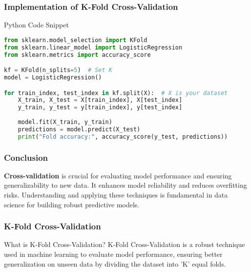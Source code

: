 \documentclass[aspectratio=169]{beamer}
\begin{document}
\begin{frame}[fragile]
    \frametitle{Implementation of K-Fold Cross-Validation}
    \begin{block}{Python Code Snippet}
    \begin{lstlisting}[language=Python]
from sklearn.model_selection import KFold
from sklearn.linear_model import LogisticRegression
from sklearn.metrics import accuracy_score

kf = KFold(n_splits=5)  # Set K
model = LogisticRegression()

for train_index, test_index in kf.split(X):  # X is your dataset
    X_train, X_test = X[train_index], X[test_index]
    y_train, y_test = y[train_index], y[test_index]
    
    model.fit(X_train, y_train)
    predictions = model.predict(X_test)
    print("Fold accuracy:", accuracy_score(y_test, predictions))
    \end{lstlisting}
    \end{block}
\end{frame}

\begin{frame}[fragile]
    \frametitle{Conclusion}
    \textbf{Cross-validation} is crucial for evaluating model performance and ensuring generalizability to new data. It enhances model reliability and reduces overfitting risks. Understanding and applying these techniques is fundamental in data science for building robust predictive models.
\end{frame}

\begin{frame}[fragile]
    \frametitle{K-Fold Cross-Validation}
    \begin{block}{What is K-Fold Cross-Validation?}
        K-Fold Cross-Validation is a robust technique used in machine learning to evaluate model performance, ensuring better generalization on unseen data by dividing the dataset into 'K' equal folds.
    \end{block}
\end{frame}
\end{document}
